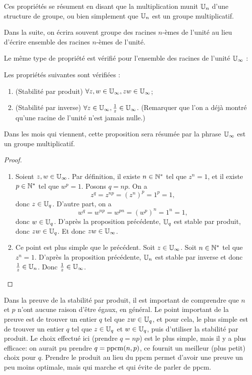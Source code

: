 \begin{remarque}
Ces propriétés se résument en disant que \og la multiplication munit $\mathbb{U}_n$ d'une structure de groupe\fg, ou bien simplement que \og $\mathbb{U}_n$ est un groupe multiplicatif\fg.
\end{remarque}

Dans la suite, on écrira souvent \og groupe des racines $n$-èmes de l'unité\fg{} au lieu d'écrire \og ensemble des racines $n$-èmes de l'unité\fg.

Le même type de propriété est vérifié pour l'ensemble des racines de l'unité $\mathbb{U}_\infty$ : 

\begin{proposition}
Les propriétés suivantes sont vérifiées :
\begin{enumerate}
\item (Stabilité par produit) $\forall z, w\in\mathbb{U}_\infty, zw\in\mathbb{U}_\infty$;
\item (Stabilité par inverse) $\forall z\in\mathbb{U}_\infty, \frac{1}{z} \in\mathbb{U}_\infty$. (Remarquer que l'on a déjà montré qu'une racine de l'unité n'est jamais nulle.)
\end{enumerate}
\end{proposition}
\begin{remarque}
Dans les mois qui viennent, cette proposition sera résumée par la phrase \og $\mathbb{U}_\infty$ est un groupe multiplicatif.\fg
\end{remarque}

\begin{proof}
\begin{enumerate}
\item Soient $z, w\in\mathbb{U}_\infty$. Par définition, il existe $n\in\mathbb{N}^*$ tel que $z^n=1$, et il existe $p\in \mathbb{N}^*$ tel que $w^p=1$. Posons $q=np$. On a 
\[ z^q=z^{np}=(z^n)^p=1^p=1,\]
donc $z\in \mathbb{U}_q$. D'autre part, on a 
\[ w^q = w^{np} = w^{pn} = (w^p)^n = 1^n=1,\]
donc $w\in \mathbb{U}_q$. D'après la proposition précédente, $\mathbb{U}_q$ est stable par produit, donc $zw \in \mathbb{U}_q$. Et donc $zw\in\mathbb{U}_\infty$.
\item Ce point est plus simple que le précédent. Soit $z\in\mathbb{U}_\infty$. Soit $n\in\mathbb{N}^*$ tel que $z^n=1$. D'après la proposition précédente, $\mathbb{U}_n$ est stable par inverse et donc $\frac{1}{z} \in \mathbb{U}_n$. Donc $\frac{1}{z} \in\mathbb{U}_\infty$.
\end{enumerate}
\end{proof}

\begin{remarque}
Dans la preuve de la stabilité par produit, il est important de comprendre que $n$ et $p$ n'ont aucune raison d'être égaux, en général. Le point important de la preuve est de trouver un entier $q$ tel que $zw \in \mathbb{U}_q$, et pour cela, le plus simple est de trouver un entier $q$ tel que $z\in \mathbb{U}_q$ et $w\in \mathbb{U}_q$, puis d'utiliser la stabilité par produit. Le choix effectué ici (prendre $q=np$) est le plus simple, mais il y a plus \og efficace\fg : on aurait pu prendre $q=\operatorname{ppcm}(n,p)$, ce fournit un meilleur (plus petit) choix pour $q$. Prendre le produit au lieu du ppcm permet d'avoir une preuve un peu moins optimale, mais qui marche et qui évite de parler de ppcm.
\end{remarque}

